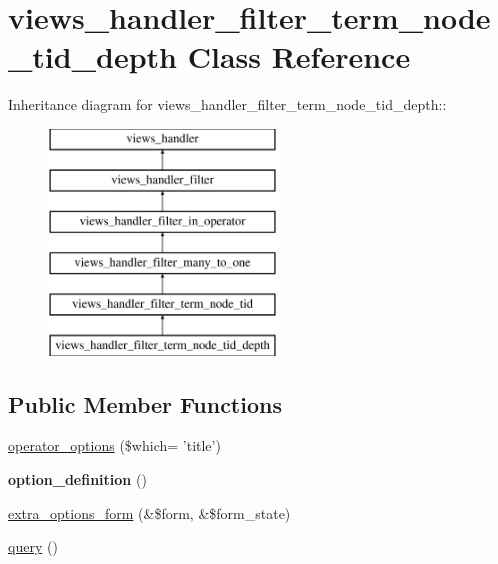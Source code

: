 \hypertarget{classviews__handler__filter__term__node__tid__depth}{
\section{views\_\-handler\_\-filter\_\-term\_\-node\_\-tid\_\-depth Class Reference}
\label{classviews__handler__filter__term__node__tid__depth}
}
Inheritance diagram for views\_\-handler\_\-filter\_\-term\_\-node\_\-tid\_\-depth::\begin{figure}[H]
\begin{center}
\leavevmode
\includegraphics[height=6cm]{classviews__handler__filter__term__node__tid__depth}
\end{center}
\end{figure}
\subsection*{Public Member Functions}
\begin{DoxyCompactItemize}
\item 
\hyperlink{classviews__handler__filter__term__node__tid__depth_aa96e237e053dea657d9c419aecea51c4}{operator\_\-options} (\$which= 'title')
\item 
\hypertarget{classviews__handler__filter__term__node__tid__depth_ae0822209bc155abaec93555bbeb93e78}{
{\bfseries option\_\-definition} ()}
\label{classviews__handler__filter__term__node__tid__depth_ae0822209bc155abaec93555bbeb93e78}

\item 
\hyperlink{classviews__handler__filter__term__node__tid__depth_a704c5e42a5a41ee12bd01b1b153431e4}{extra\_\-options\_\-form} (\&\$form, \&\$form\_\-state)
\item 
\hyperlink{classviews__handler__filter__term__node__tid__depth_aff1d2c0057597790a56bffd0674f391a}{query} ()
\end{DoxyCompactItemize}


